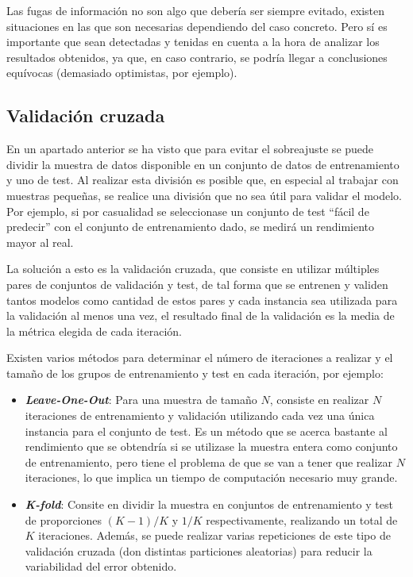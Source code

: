 Las fugas de información no son algo que debería ser siempre evitado, existen
situaciones en las que son necesarias dependiendo del caso concreto. Pero sí es
importante que sean detectadas y tenidas en cuenta a la hora de analizar los
resultados obtenidos, ya que, en caso contrario, se podría llegar a conclusiones
equívocas (demasiado optimistas, por ejemplo).

\subsection{Validación cruzada}

En un apartado anterior se ha visto que para evitar el sobreajuste se puede
dividir la muestra de datos disponible en un conjunto de datos de entrenamiento
y uno de test. Al realizar esta división es posible que, en especial al trabajar
con muestras pequeñas, se realice una división que no sea útil para validar el
modelo. Por ejemplo, si por casualidad se seleccionase un conjunto de test
``fácil de predecir'' con el conjunto de entrenamiento dado, se medirá un
rendimiento mayor al real.

La solución a esto es la validación cruzada, que consiste en utilizar múltiples
pares de conjuntos de validación y test, de tal forma que se entrenen y validen
tantos modelos como cantidad de estos pares y cada instancia sea utilizada para
la validación al menos una vez, el resultado final de la validación es la media
de la métrica elegida de cada iteración.

Existen varios métodos para determinar el número de iteraciones a realizar y el
tamaño de los grupos de entrenamiento y test en cada iteración, por ejemplo:

\begin{itemize}
    \item \textbf{\textit{Leave-One-Out}}: Para una muestra de tamaño $N$,
    consiste en realizar $N$ iteraciones de entrenamiento y validación
    utilizando cada vez una única instancia para el conjunto de test. Es un
    método que se acerca bastante al rendimiento que se obtendría si se
    utilizase la muestra entera como conjunto de entrenamiento, pero tiene el
    problema de que se van a tener que realizar $N$ iteraciones, lo que implica
    un tiempo de computación necesario muy grande.
    \item \textbf{\textit{K-fold}}: Consite en dividir la muestra en conjuntos
    de entrenamiento y test de proporciones $(K-1)/K$ y $1/K$ respectivamente,
    realizando un total de $K$ iteraciones. Además, se puede realizar varias
    repeticiones de este tipo de validación cruzada (don distintas particiones
    aleatorias) para reducir la variabilidad del error obtenido.
\end{itemize}

